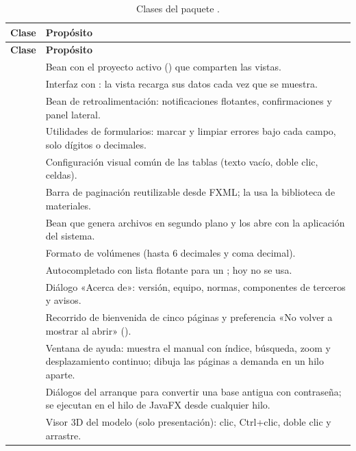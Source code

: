 \begin{longtable}{L{6.2cm}L{8.6cm}}
	\caption{Clases del paquete .} \label{tab:est-ui} \\
	\hline
	\textbf{Clase} & \textbf{Propósito} \\ \hline
	\endfirsthead
	\hline
	\textbf{Clase} & \textbf{Propósito} \\ \hline
	\endhead
	\hline
	\endfoot
	 & Bean con el proyecto activo () que comparten las vistas. \\
	 & Interfaz con : la vista recarga sus datos cada vez que se muestra. \\
	 & Bean de retroalimentación: notificaciones flotantes, confirmaciones y panel lateral. \\
	 & Utilidades de formularios: marcar y limpiar errores bajo cada campo, solo dígitos o decimales. \\
	 & Configuración visual común de las tablas (texto vacío, doble clic, celdas). \\
	 & Barra de paginación reutilizable desde FXML; la usa la biblioteca de materiales. \\
	 & Bean que genera archivos en segundo plano y los abre con la aplicación del sistema. \\
	 & Formato de volúmenes (hasta 6 decimales y coma decimal). \\
	 & Autocompletado con lista flotante para un ; hoy no se usa. \\
	 & Diálogo «Acerca de»: versión, equipo, normas, componentes de terceros y avisos. \\
	 & Recorrido de bienvenida de cinco páginas y preferencia «No volver a mostrar al abrir»
	(). \\
	 & Ventana de ayuda: muestra el manual con índice, búsqueda, zoom y desplazamiento continuo; dibuja
	las páginas a demanda en un hilo aparte. \\
	 & Diálogos del arranque para convertir una base antigua con contraseña; se ejecutan en el
	hilo de JavaFX desde cualquier hilo. \\
	 & Visor 3D del modelo (solo presentación): clic, Ctrl+clic, doble clic y arrastre. \\

\end{longtable}
